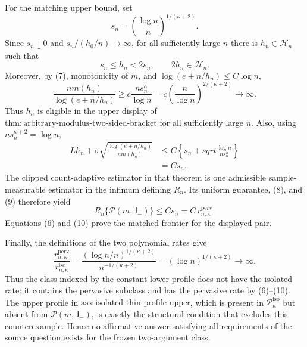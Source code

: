 For the matching upper bound, set
\[
 s_n=\left(\frac{\log n}{n}\right)^{1/(\kappa+2)}.
\]
Since \(s_n\downarrow0\) and \(s_n/(h_0/n)\to\infty\), for all sufficiently large \(n\) there is \(h_n\in\mathcal H_n\) such that
\[
 s_n\le h_n<2s_n,
 \qquad 2h_n\in\mathcal H_n. \tag{7}
\]
Moreover, by (7), monotonicity of \(m\), and \(\log(e+n/h_n)\le C\log n\),
\[
 \frac{nm(h_n)}{\log(e+n/h_n)}
 \ge c\frac{ns_n^\kappa}{\log n}
 =c\left(\frac n{\log n}\right)^{2/(\kappa+2)}
 \longrightarrow\infty. \tag{8}
\]
Thus \(h_n\) is eligible in the upper display of \(\mathrm{thm:arbitrary\text{-}modulus\text{-}two\text{-}sided\text{-}bracket}\) for all sufficiently large \(n\).  Also, using \(ns_n^{\kappa+2}=\log n\),
\[
 \begin{aligned}
 Lh_n+\sigma\sqrt{\frac{\log(e+n/h_n)}{nm(h_n)}}
 &\le C\left\{s_n+sqrt{\frac{\log n}{ns_n^\kappa}}\right\}\\
 &=Cs_n.
 \end{aligned} \tag{9}
\]
The clipped count-adaptive estimator in that theorem is one admissible sample-measurable estimator in the infimum defining \(R_n\).  Its uniform guarantee, (8), and (9) therefore yield
\[
 R_n\{\mathcal P(m,\mathsf J_{-})\}
 \le C s_n
 =C\,r_{n,\kappa}^{\mathrm{perv}}. \tag{10}
\]
Equations (6) and (10) prove the matched frontier for the displayed pair.

Finally, the definitions of the two polynomial rates give
\[
 \frac{r_{n,\kappa}^{\mathrm{perv}}}
 {r_{n,\kappa}^{\mathrm{iso}}}
 =\frac{(\log n/n)^{1/(\kappa+2)}}{n^{-1/(\kappa+2)}}
 =(\log n)^{1/(\kappa+2)}\to\infty. \tag{11}
\]
Thus the class indexed by the constant lower profile does not have the isolated rate: it contains the pervasive subclass and has the pervasive rate by (6)--(10).  The upper profile in \(\mathrm{ass:isolated\text{-}thin\text{-}profile\text{-}upper}\), which is present in \(\mathcal P_{\kappa}^{\mathrm{iso}}\) but absent from \(\mathcal P(m,\mathsf J_{-})\), is exactly the structural condition that excludes this counterexample.  Hence no affirmative answer satisfying all requirements of the source question exists for the frozen two-argument class.